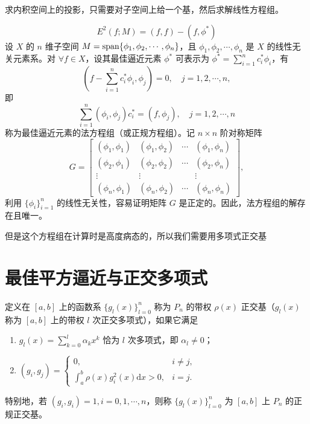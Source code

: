 求内积空间上的投影，只需要对子空间上给一个基，然后求解线性方程组。
\begin{theorem}[求内积空间的最佳逼近]
    \[
        E^2(f; M) = (f, f) - (f, \phi^*)
    \]
    设 \(X\) 的 \(n\) 维子空间 \(M = \operatorname{span}\{\phi_1, \phi_2, \cdots,
    \phi_n\}\)，且 \(\phi_1, \phi_2, \cdots, \phi_n\) 是 \(X\) 的线性无关元素系。对
    \(\forall f \in X\)，设其最佳逼近元素 \(\phi^*\) 可表示为 \(\phi^* = \sum_{i=1}^n c_i^*
    \phi_i\)，有
    \[
        \left( f - \sum_{i=1}^n c_i^* \phi_i, \phi_j \right) = 0, \quad j
        = 1, 2, \cdots, n,
    \]
    即
    \[
        \sum_{i=1}^n (\phi_i, \phi_j) c_i^* = (f, \phi_j), \quad j = 1,
        2, \cdots, n
    \]
    称为最佳逼近元素的法方程组（或正规方程组）。记 \(n \times n\) 阶对称矩阵
    \[
        G =
        \begin{bmatrix}
            (\phi_1, \phi_1) & (\phi_1, \phi_2) & \cdots & (\phi_1, \phi_n) \\
            (\phi_2, \phi_1) & (\phi_2, \phi_2) & \cdots & (\phi_2, \phi_n) \\
            \vdots & \vdots & & \vdots \\
            (\phi_n, \phi_1) & (\phi_n, \phi_2) & \cdots & (\phi_n, \phi_n)
        \end{bmatrix},
    \]
    利用 \(\{\phi_i\}_{i=1}^n\) 的线性无关性，容易证明矩阵 \(G\) 是正定的。因此，法方程组的解存在且唯一。
\end{theorem}

但是这个方程组在计算时是高度病态的，所以我们需要用多项式正交基
\section{最佳平方逼近与正交多项式}

\begin{definition}
    定义在 \([a, b]\) 上的函数系 \(\{g_l(x)\}_{l=0}^n\) 称为 \(P_n\) 的带权
    \(\rho(x)\) 正交基（\(g_l(x)\) 称为 \([a, b]\) 上的带权 \(l\) 次正交多项式），如果它满足
    \begin{enumerate}
        \item \(g_l(x) = \sum_{k=0}^l \alpha_k x^k\) 恰为 \(l\) 次多项式，即
            \(\alpha_l \neq 0\)；
        \item \((g_i, g_j) =
                \begin{cases} 0, & i \neq j, \\ \int_a^b \rho(x)
                    g_i^2(x) \mathrm{d}x > 0, & i = j.
            \end{cases}\)
    \end{enumerate}
    特别地，若 \((g_i, g_i) = 1, i = 0, 1, \cdots, n\)，则称
    \(\{g_l(x)\}_{l=0}^n\) 为 \([a, b]\) 上 \(P_n\) 的正规正交基。
\end{definition}

